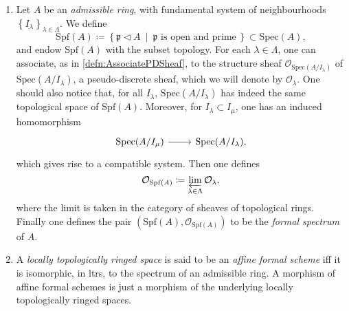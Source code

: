 \begin{defn}\leavevmode\vspace{-\baselineskip}
\begin{enumerate}
\item Let $A$ be an {\em admissible ring}, with fundamental system of
	neighbourhoods $\left\{ I_\lambda \right\}_{\lambda \in \Lambda}$.
	We define
	\begin{equation*}
	\mathrm{Spf}(A) \coloneqq
	\left\{ \mathfrak{p} \triangleleft A \ \middle|\ \mathfrak{p}
	\text{ is open and prime}\, \right\} \subset \mathrm{Spec}(A)
	,\end{equation*}
	and endow $\mathrm{Spf}(A)$ with the subset topology.
	For each $\lambda \in \Lambda$, one can associate,
	as in \cref{defn:AssociatePDSheaf},
	to the structure sheaf $\mathcal{O}_{\mathrm{Spec}(A/I_\lambda)}$
	of $\mathrm{Spec}(A/I_\lambda)$,
	a pseudo-discrete sheaf, which we will denote by $\mathcal{O}_\lambda$.
	One should also notice that, for all $I_\lambda$,
	$\mathrm{Spec}(A/I_\lambda)$ has indeed the same topological space
	of $\mathrm{Spf}(A)$.
	Moreover, for $I_\lambda \subset I_\mu$, one has an induced homomorphism
	\begin{equation*}
	\begin{tikzcd}[row sep = 0ex
		,/tikz/column 1/.append style={anchor=base east}
		,/tikz/column 2/.append style={anchor=base west}]
		\mathrm{Spec}(A/I_\mu) \arrow[r, "", rightarrow] &
		\mathrm{Spec}(A/I_\lambda)
	,\end{tikzcd}
	\end{equation*} 
	which gives rise to a compatible system.
	Then one defines
	\begin{equation*}
	\mathcal{O}_{\mathrm{Spf}(A)} \coloneqq
	\varprojlim_{\lambda \in \Lambda} \mathcal{O}_\lambda
	,\end{equation*}
	where the limit is taken in the category of sheaves of topological rings.
	Finally one defines the pair $( \mathrm{Spf}(A) , \mathcal{O}_{ \mathrm{Spf}(A) } )$
	to be the {\em formal spectrum} of $A$.

\item A {\em locally topologically ringed space} is said to be an 
	{\em affine formal scheme} iff it is isomorphic,
	in ltrs, to the spectrum of an admissible ring.
	A morphism of affine formal schemes is just a morphism of the underlying
	locally topologically ringed spaces.
\end{enumerate}
\end{defn}


